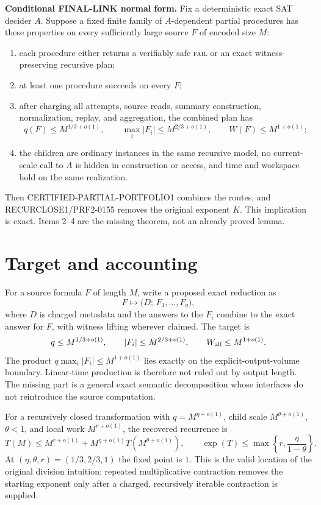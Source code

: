 \documentclass[11pt]{article}
\begin{document}
\textbf{Conditional FINAL-LINK normal form.}
Fix a deterministic exact SAT decider $A$.  Suppose a fixed finite family of $A$-dependent partial procedures has these properties on every sufficiently large source $F$ of encoded size $M$:
\begin{enumerate}
  \item each procedure either returns a verifiably safe \textsc{fail} or an exact witness-preserving recursive plan;
  \item at least one procedure succeeds on every $F$;
  \item after charging all attempts, source reads, summary construction, normalization, replay, and aggregation, the combined plan has
  \[
       q(F)\le M^{1/3+o(1)},\qquad
       \max_i |F_i|\le M^{2/3+o(1)},\qquad
       W(F)\le M^{1+o(1)};
  \]
  \item the children are ordinary instances in the same recursive model, no current-scale call to $A$ is hidden in construction or access, and time and workspace hold on the same realization.
\end{enumerate}
Then \textsc{CERTIFIED-PARTIAL-PORTFOLIO1} combines the routes, and \textsc{RECURCLOSE1}/\textsc{PRF2-0155} removes the original exponent $K$.  This implication is exact.  Items 2--4 are the missing theorem, not an already proved lemma.

\section{Target and accounting}

For a source formula $F$ of length $M$, write a proposed exact reduction as
\[
  F \longmapsto \bigl(D;\,F_1,\ldots,F_q\bigr),
\]
where $D$ is charged metadata and the answers to the $F_i$ combine to the exact answer for $F$, with witness lifting wherever claimed.  The target is
\begin{equation}
\label{eq:target}
  q\le M^{1/3+o(1)},\qquad |F_i|\le M^{2/3+o(1)},\qquad
  W_{\rm all}\le M^{1+o(1)}.
\end{equation}
The product $q\max_i|F_i|\le M^{1+o(1)}$ lies exactly on the explicit-output-volume boundary.  Linear-time production is therefore not ruled out by output length.  The missing part is a general exact semantic decomposition whose interfaces do not reintroduce the source computation.

For a recursively closed transformation with $q=M^{\eta+o(1)}$, child scale $M^{\theta+o(1)}$, $\theta<1$, and local work $M^{r+o(1)}$, the recovered recurrence is
\begin{equation}
\label{eq:recurrence}
  T(M)\le M^{r+o(1)}+M^{\eta+o(1)}T(M^{\theta+o(1)}),
  \qquad
  \operatorname{exp}(T)\le \max\left\{r,\frac{\eta}{1-\theta}\right\}.
\end{equation}
At $(\eta,\theta,r)=(1/3,2/3,1)$ the fixed point is $1$.  This is the valid location of the original division intuition: repeated multiplicative contraction removes the starting exponent only after a charged, recursively iterable contraction is supplied.
\end{document}
